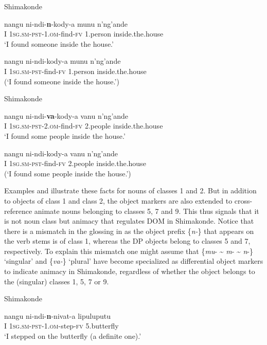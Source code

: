\documentclass[output=paper]{langsci/langscibook}
\begin{document}
{Shimakonde}

\ea
\gll nangu       ni-ndi-\textbf{n}{}-kody-a                      munu            n'ng'ande\\
     I               \textsc{1sg.sm-pst}{}-1.\textsc{om}{}-find-\textsc{fv}       1.person       inside.the.house\\
\glt ‘I found someone inside the house.’
\z

\ea
\gll *nangu     ni-ndi-kody-a                         munu            n'ng'ande\\
     I               \textsc{1sg.sm-pst}{}-find-\textsc{fv}                1.person       inside.the.house\\
\glt (‘I found someone inside the house.’)
\z

{Shimakonde}

\ea
\gll nangu      ni-ndi-\textbf{va}{}-kody-a                     vanu             n'ng'ande\\
     I              \textsc{1sg.sm-pst-2.om}{}-find-\textsc{fv}        2.people       inside.the.house\\
\glt ‘I found some people inside the house.’
\z

\ea
\gll *nangu     ni-ndi-kody-a                        vanu              n'ng'ande\\
     I               \textsc{1sg.sm-pst}{}-find-\textsc{fv}               2.people        inside.the.house\\
\glt (‘I found some people inside the house.’)
\z

Examples  {and } {}illustrate these facts for nouns of classes 1 and 2. But in addition to objects of class 1 and class 2, the object markers are also extended to cross-reference animate nouns belonging to classes 5, 7 and 9. This thus signals that {it is not noun class but animacy }that regulates DOM in Shimakonde. Notice that there is a mismatch in the glossing in  as the object prefix  \{{\textit{n-}}\} that appears on the verb stems is of class 1, whereas the DP objects belong to classes 5 and 7, respectively. To explain this mismatch one might assume that \{{\textit{mu}}{}- {\textasciitilde} {\textit{m}}{}- {\textasciitilde} {\textit{n}}{}-\} ‘singular’ and \{\textit{va-}\} ‘plural’ have become specialized as differential object markers to indicate animacy in Shimakonde, regardless of whether the object belongs to the (singular) classes 1, 5, 7 or 9.

{Shimakonde}

\ea
\gll nangu        ni-ndi-\textbf{n}{}-nivat-a                           lipuluputu\\
     I                \textsc{1sg.sm-pst-1.om}{}-step-\textsc{fv}            5.butterfly\\
\glt ‘I stepped on the butterfly (a definite one).’
\z
\end{document}
